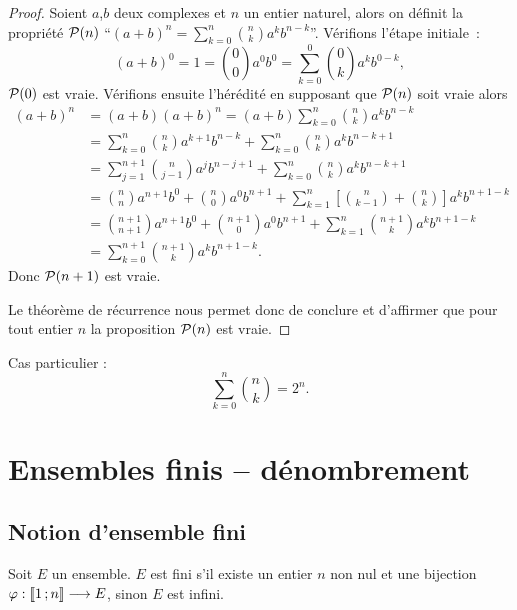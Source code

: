 \begin{proof}
  Soient \(a\),\(b\) deux complexes et \(n\) un entier naturel, alors on 
  définit la propriété \(\P(n)\) ``\((a + b)^n = \sum_{k = 0}^n 
  \binom{n}{k}a^kb^{n - k}\)''. Vérifions l'étape initiale~:
  \begin{equation}
    (a + b)^0 = 1 = \binom{0}{0}a^0b^0 = \sum_{k = 0}^0 \binom{0}{k}a^kb^{0 
    - k},
  \end{equation}
  \(\P(0)\) est vraie. Vérifions ensuite l'hérédité en supposant que 
  \(\P(n)\) soit vraie alors
  \begin{align}
    (a + b)^n & = (a + b)(a + b)^n = (a + b)\sum_{k = 0}^n 
    \binom{n}{k}a^kb^{n - k}\\
              & = \sum_{k = 0}^n \binom{n}{k}a^{k + 1}b^{n - k}+\sum_{k = 
              0}^n \binom{n}{k}a^kb^{n - k + 1}\\
              & = \sum_{j = 1}^{n + 1} \binom{n}{j - 1}a^{j}b^{n - j + 
              1}+\sum_{k = 0}^n \binom{n}{k}a^kb^{n - k + 1}\\
              & = \binom{n}{n}a^{n + 1}b^0 +\binom{n}{0}a^0b^{n + 1} + 
              \sum_{k = 1}^{n}\left[\binom{n}{k - 
              1}+\binom{n}{k}\right]a^kb^{n + 1 - k}\\
              & = \binom{n + 1}{n + 1}a^{n + 1}b^0 + \binom{n + 1}{0}a^0b^{n 
              + 1}+ \sum_{k = 1}^{n}\binom{n + 1}{k}a^kb^{n + 1 - k}\\
              & = \sum_{k = 0}^{n + 1}\binom{n + 1}{k}a^kb^{n + 1 - k}.
  \end{align}
  Donc \(\P(n + 1)\) est vraie.

  Le théorème de récurrence nous permet donc de conclure et d'affirmer que 
  pour tout entier \(n\) la proposition \(\P(n)\) est vraie.
\end{proof}
Cas particulier :
\begin{equation}
  \sum_{k = 0}^n \binom{n}{k} = 2^n.
\end{equation}

\section{Ensembles finis -- dénombrement}

\subsection{Notion d'ensemble fini}

\begin{defdef}
  Soit \(E\) un ensemble. \(E\) est fini s'il existe un entier \(n\) non nul 
  et une bijection \(\fonctionR{\varphi}{\intervalleentier{1}{n}}{E}\), 
  sinon \(E\) est infini.
\end{defdef}

